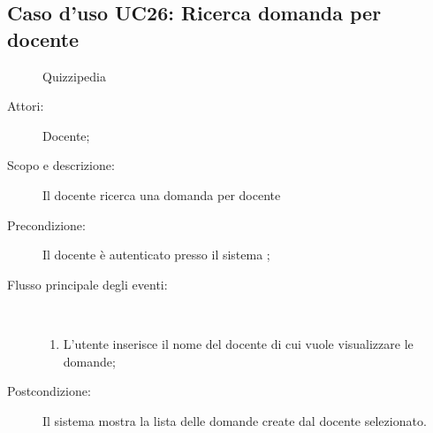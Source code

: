 \subsection{Caso d'uso UC26: Ricerca domanda per docente}
	\begin{figure}[H]
		\centering
		\begin{resizedtikzpicture}{\textwidth}
		\begin{umlsystem}[x=0, fill=lightgray!20]{Quizzipedia}
		\end{umlsystem}
		\end{resizedtikzpicture}
		\caption{}
	\end{figure}
\begin{description}
\item[Attori:] Docente;
\item[Scopo e descrizione:] Il docente ricerca una domanda per docente
      \item[Precondizione:] Il docente è autenticato presso il sistema
;

        \item[Flusso principale degli eventi:] \ 
 \begin{enumerate}
          \item L'utente inserisce il nome del docente di cui vuole visualizzare le domande;

      \end{enumerate}
    \item[Postcondizione:] Il sistema mostra la lista delle domande create dal docente selezionato.
  \end{description}
\hypertarget{UC27}{}
